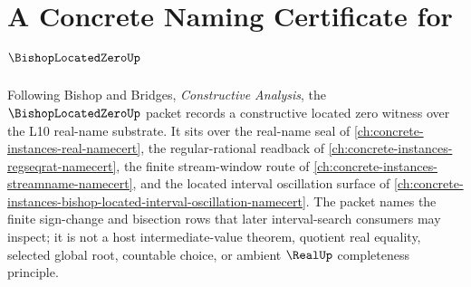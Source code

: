 \chapter{A Concrete Naming Certificate for $\BishopLocatedZeroUp$}
\label{ch:concrete-instances-bishop-located-zero-namecert}

Following Bishop and Bridges, \emph{Constructive Analysis}, the $\BishopLocatedZeroUp$ packet records a constructive located zero witness over the L10 real-name substrate. It sits over the real-name seal of \autoref{ch:concrete-instances-real-namecert}, the regular-rational readback of \autoref{ch:concrete-instances-regseqrat-namecert}, the finite stream-window route of \autoref{ch:concrete-instances-streamname-namecert}, and the located interval oscillation surface of \autoref{ch:concrete-instances-bishop-located-interval-oscillation-namecert}. The packet names the finite sign-change and bisection rows that later interval-search consumers may inspect; it is not a host intermediate-value theorem, quotient real equality, selected global root, countable choice, or ambient $\RealUp$ completeness principle.

